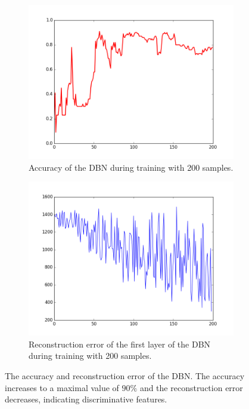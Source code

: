\begin{figure}[h!]
	\centering
	\begin{subfigure}[t]{.45\textwidth}
  		\centering
  		\includegraphics[width=.9\linewidth]{imgs/poker/acc.png}
  		\caption{Accuracy of the DBN during training with 200 samples.}
  		\label{fig:sub1}
	\end{subfigure}%
	\begin{subfigure}[t]{.45\textwidth}
  		\centering
  		\includegraphics[width=.9\linewidth]{imgs/poker/recon_err.png}
  		\caption{Reconstruction error of the first layer of the DBN during training with 200 samples.}
  		\label{fig:sub2}
	\end{subfigure}
	\caption{The accuracy and reconstruction error of the DBN. The accuracy increases to a maximal value of $90 \%$ and the reconstruction error decreases, indicating discriminative features. }
	\label{fig:poker_err}
\end{figure}


